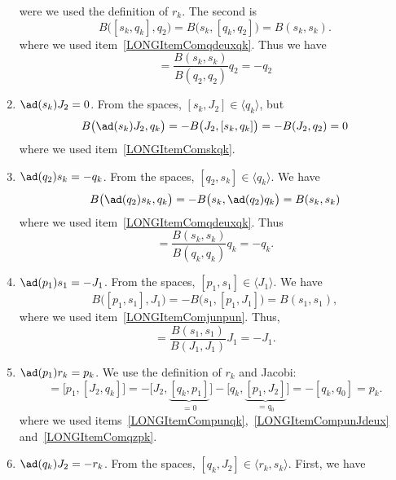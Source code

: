 \begin{enumerate}
	      were we used the definition of $r_k$. The second is
	      \begin{equation}
		      B\big( [s_k,q_k],q_2 \big)=B\big( s_k,[q_k,q_2] \big)=B(s_k,s_k).
	      \end{equation}
	      where we used item~\ref{LONGItemComqdeuxqk}. Thus we have
	      \begin{equation}
		      [s_k,q_k]=\frac{ B(s_k,s_k) }{ B(q_2,q_2) }q_2=-q_2
	      \end{equation}
	\item$\ad(s_k)J_2=0$. From the spaces, $[s_k,J_2]\in\langle q_k\rangle$, but
	      \begin{equation}
		      B\big( \ad(s_k)J_2,q_k \big)=-B\big( J_2,[s_k,q_k] \big)=-B(J_2,q_2)=0
	      \end{equation}
	      where we used item~\ref{LONGItemComskqk}.
	\item$\ad(q_2)s_k=-q_k$. From the spaces, $[q_2,s_k]\in\langle q_k\rangle$. We have
	      \begin{equation}
		      B\big( \ad(q_2)s_k,q_k \big)=-B\big( s_k,\ad(q_2)q_k \big)=B(s_k,s_k)
	      \end{equation}
	      where we used item~\ref{LONGItemComqdeuxqk}. Thus
	      \begin{equation}
		      [q_2,s_k]=\frac{ B(s_k,s_k) }{ B(q_k,q_k) }q_k=-q_k.
	      \end{equation}
	\item$\ad(p_1)s_1=-J_1$. From the spaces, $[p_1,s_1]\in\langle J_1\rangle$. We have
	      \begin{equation}
		      B\big( [p_1,s_1],J_1 \big)=-B\big( s_1,[p_1,J_1] \big)=B(s_1,s_1),
	      \end{equation}
	      where we used item~\ref{LONGItemComjunpun}. Thus,
	      \begin{equation}
		      [p_1,s_1]=\frac{ B(s_1,s_1) }{ B(J_1,J_1) }J_1=-J_1.
	      \end{equation}
	\item$\ad(p_1)r_k=p_k$\label{LONGItemCompunrk}. We use the definition of $r_k$ and Jacobi:
	      \begin{equation}
		      [p_1,r_k]=\big[ p_1,[J_2,q_k] \big]=-\big[ J_2,\underbrace{[q_k,p_1]}_{=0} \big]-\big[ q_k,\underbrace{[p_1,J_2]}_{=q_0} \big]=-[q_k,q_0]=p_k.
	      \end{equation}
	      where we used items~\ref{LONGItemCompunqk},~\ref{LONGItemCompunJdeux} and~\ref{LONGItemComqzpk}.
	\item$\ad(q_k)J_2=-r_k$\label{LONGItemComkJdeux}. From the spaces, $[q_k,J_2]\in\langle r_k,s_k\rangle$. First, we have

\end{enumerate}
